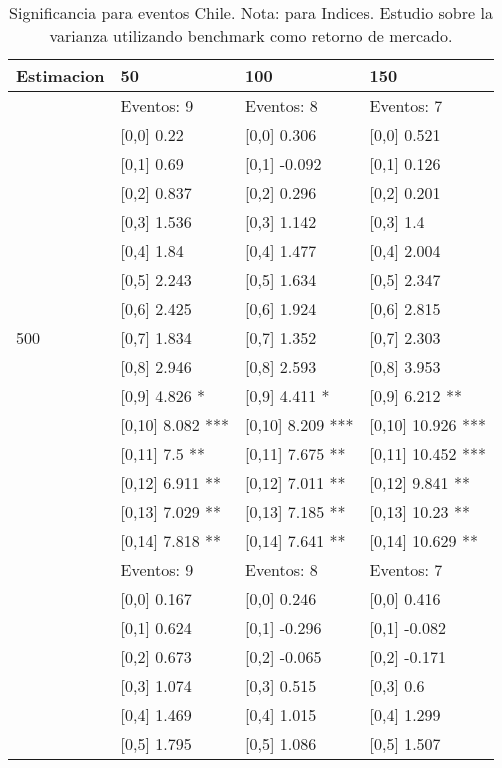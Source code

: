 \begin{table}

\caption{Significancia para eventos Chile. Nota: para Indices. Estudio sobre la varianza utilizando benchmark como retorno de mercado.}
\centering
\begin{tabular}[t]{llll}
\toprule
Estimacion & 50 & 100 & 150\\
\midrule
 & Eventos:  9 & Eventos:  8 & Eventos:  7\\
 & {}[0,0] 0.22 & {}[0,0] 0.306 & {}[0,0] 0.521\\
 & {}[0,1] 0.69 & {}[0,1] -0.092 & {}[0,1] 0.126\\
 & {}[0,2] 0.837 & {}[0,2] 0.296 & {}[0,2] 0.201\\
 & {}[0,3] 1.536 & {}[0,3] 1.142 & {}[0,3] 1.4\\
\addlinespace
 & {}[0,4] 1.84 & {}[0,4] 1.477 & {}[0,4] 2.004\\
 & {}[0,5] 2.243 & {}[0,5] 1.634 & {}[0,5] 2.347\\
 & {}[0,6] 2.425 & {}[0,6] 1.924 & {}[0,6] 2.815\\
500 & {}[0,7] 1.834 & {}[0,7] 1.352 & {}[0,7] 2.303\\
 & {}[0,8] 2.946 & {}[0,8] 2.593 & {}[0,8] 3.953\\
\addlinespace
 & {}[0,9] 4.826 * & {}[0,9] 4.411 * & {}[0,9] 6.212 **\\
 & {}[0,10] 8.082 *** & {}[0,10] 8.209 *** & {}[0,10] 10.926 ***\\
 & {}[0,11] 7.5 ** & {}[0,11] 7.675 ** & {}[0,11] 10.452 ***\\
 & {}[0,12] 6.911 ** & {}[0,12] 7.011 ** & {}[0,12] 9.841 **\\
 & {}[0,13] 7.029 ** & {}[0,13] 7.185 ** & {}[0,13] 10.23 **\\
\addlinespace
 & {}[0,14] 7.818 ** & {}[0,14] 7.641 ** & {}[0,14] 10.629 **\\
 & Eventos:  9 & Eventos:  8 & Eventos:  7\\
 & {}[0,0] 0.167 & {}[0,0] 0.246 & {}[0,0] 0.416\\
 & {}[0,1] 0.624 & {}[0,1] -0.296 & {}[0,1] -0.082\\
 & {}[0,2] 0.673 & {}[0,2] -0.065 & {}[0,2] -0.171\\
\addlinespace
 & {}[0,3] 1.074 & {}[0,3] 0.515 & {}[0,3] 0.6\\
 & {}[0,4] 1.469 & {}[0,4] 1.015 & {}[0,4] 1.299\\
 & {}[0,5] 1.795 & {}[0,5] 1.086 & {}[0,5] 1.507\\

\end{tabular}
\end{table}

